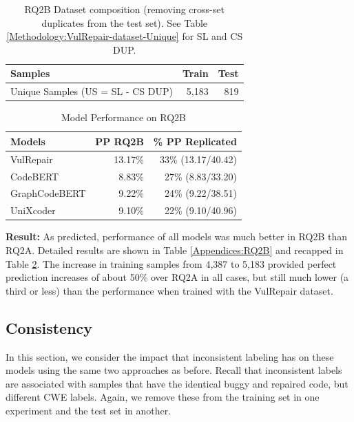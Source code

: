 \begin{table}[h]
\centering
 \caption{RQ2B Dataset composition (removing cross-set duplicates from the test set). See Table \ref{Methodology:VulRepair-dataset-Unique} for SL and CS DUP.}
 \label{Methodology:RQ2B-removed-crossfile-from-test}
 \begin{tabular}{|l|r|r|}
   \hline
   Samples &Train &Test\\
   \hline
   Unique Samples (US = SL - CS DUP)                    &5,183   &819\\
 \hline
\end{tabular}
\end{table}

\begin{table}[h]
\centering
  \caption{Model Performance on RQ2B}
  \label{Methodology:RQ2Bdataset-ModelPerformance}
  \begin{tabular}{|l|r|r|}
    \hline
    Models          & PP RQ2B & \% PP Replicated\\
    \hline
    VulRepair       & 13.17\% & 33\% (13.17/40.42)\\
    \hline
    CodeBERT        & 8.83\% &  27\% \enspace(8.83/33.20)\\
    \hline
    GraphCodeBERT   & 9.22\% & 24\% \enspace(9.22/38.51)\\
    \hline
    UniXcoder       & 9.10\% & 22\% \enspace(9.10/40.96)\\
  \hline
\end{tabular}
\end{table}

\textbf{Result:}
As predicted, performance of all models was much better in RQ2B than  RQ2A. Detailed results are shown in Table \ref{Appendices:RQ2B} and recapped in Table \ref{Methodology:RQ2Bdataset-ModelPerformance}.
The increase in training samples from 4,387 to 5,183 provided perfect prediction increases of about 50\% over RQ2A in all cases, but still much lower (a third or less) than the performance when trained with the VulRepair dataset.
%
%

\subsection{Consistency}\label{Consistency}
In this section, we consider the impact that inconsistent labeling has on these models using the same two approaches as before.
Recall that inconsistent labels are associated with samples that have the identical buggy and repaired code, but different CWE labels.
Again, we remove these from the training set in one experiment and the test set in another.

